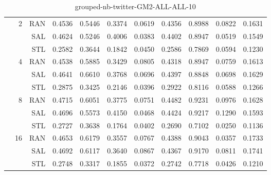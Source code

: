 \begin{center}
\begin{table}[htbp]
\begin{tabular}{ | r | r | r | r | r | r | r | r | r | r | r |}
 & \multirow{3}{*}{2} & RAN & 0.4536 & 0.5446 & 0.3374 & 0.0619 & 0.4356 & 0.8988 & 0.0822 & 0.1631\\ \cline{3-11}
 &   & SAL & 0.4624 & 0.5246 & 0.4006 & 0.0383 & 0.4402 & 0.8947 & 0.0519 & 0.1549\\ \cline{3-11}
 &   & STL & 0.2582 & 0.3644 & 0.1842 & 0.0450 & 0.2586 & 0.7869 & 0.0594 & 0.1230\\ \cline{2-11}
 & \multirow{3}{*}{4} & RAN & 0.4538 & 0.5885 & 0.3429 & 0.0805 & 0.4318 & 0.8947 & 0.0759 & 0.1613\\ \cline{3-11}
 &   & SAL & 0.4641 & 0.6610 & 0.3768 & 0.0696 & 0.4397 & 0.8848 & 0.0698 & 0.1629\\ \cline{3-11}
 &   & STL & 0.2875 & 0.3425 & 0.2146 & 0.0396 & 0.2922 & 0.8116 & 0.0588 & 0.1266\\ \cline{2-11}
 & \multirow{3}{*}{8} & RAN & 0.4715 & 0.6051 & 0.3775 & 0.0751 & 0.4482 & 0.9231 & 0.0976 & 0.1628\\ \cline{3-11}
 &   & SAL & 0.4696 & 0.5573 & 0.4150 & 0.0468 & 0.4424 & 0.9217 & 0.1290 & 0.1593\\ \cline{3-11}
 &   & STL & 0.2727 & 0.3638 & 0.1764 & 0.0402 & 0.2690 & 0.7102 & 0.0250 & 0.1136\\ \cline{2-11}
 & \multirow{3}{*}{16} & RAN & 0.4653 & 0.6179 & 0.3557 & 0.0767 & 0.4388 & 0.9043 & 0.0357 & 0.1733\\ \cline{3-11}
 &   & SAL & 0.4692 & 0.6117 & 0.3640 & 0.0867 & 0.4367 & 0.9170 & 0.0811 & 0.1741\\ \cline{3-11}
 &   & STL & 0.2748 & 0.3317 & 0.1855 & 0.0372 & 0.2742 & 0.7718 & 0.0426 & 0.1210\\ \cline{2-11}
\hline
\end{tabular}
\caption{grouped-nb-twitter-GM2-ALL-ALL-10}
\end{table}
\end{center}

